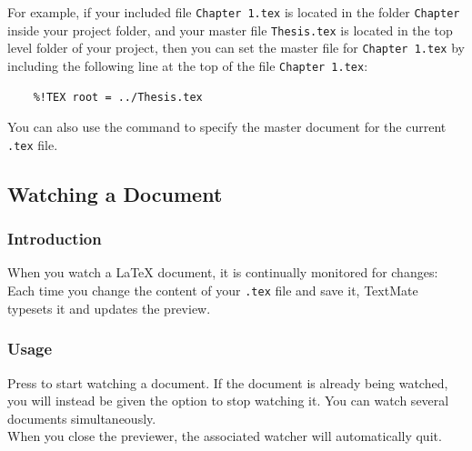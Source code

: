 \documentclass[11pt, x11names]{article}
\begin{document}
For example, if your included file \texttt{Chapter\ 1.tex} is located in the folder \texttt{Chapter} inside your project folder, and your master file \texttt{Thesis.tex} is located in the top level folder of your project, then you can set the master file for \texttt{Chapter\ 1.tex} by including the following line at the top of the file \texttt{Chapter\ 1.tex}:

\begin{verbatim}
    %!TEX root = ../Thesis.tex
\end{verbatim}

You can also use the command  to specify the master document for the current \texttt{.tex} file.

\subsection{Watching a Document}

\subsubsection{Introduction}

When you watch a LaTeX document, it is continually monitored for changes: Each time you change the content of your \texttt{.tex} file and save it, TextMate typesets it and updates the preview.

\subsubsection{Usage}

Press  to start watching a document. If the document is already being watched, you will instead be given the option to stop watching it. You can watch several documents simultaneously.\\

When you close the previewer, the associated watcher will automatically quit.
\end{document}
